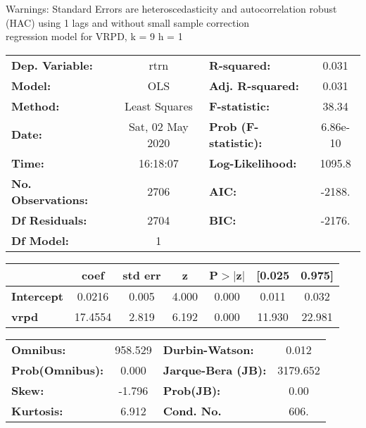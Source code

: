 Warnings: \newline
 [1] Standard Errors are heteroscedasticity and autocorrelation robust (HAC) using 1 lags and without small sample correction\\ 

regression model for VRPD, k = 9 h = 1\begin{center}
\begin{tabular}{lclc}
\toprule
\textbf{Dep. Variable:}    &       rtrn       & \textbf{  R-squared:         } &     0.031   \\
\textbf{Model:}            &       OLS        & \textbf{  Adj. R-squared:    } &     0.031   \\
\textbf{Method:}           &  Least Squares   & \textbf{  F-statistic:       } &     38.34   \\
\textbf{Date:}             & Sat, 02 May 2020 & \textbf{  Prob (F-statistic):} &  6.86e-10   \\
\textbf{Time:}             &     16:18:07     & \textbf{  Log-Likelihood:    } &    1095.8   \\
\textbf{No. Observations:} &        2706      & \textbf{  AIC:               } &    -2188.   \\
\textbf{Df Residuals:}     &        2704      & \textbf{  BIC:               } &    -2176.   \\
\textbf{Df Model:}         &           1      & \textbf{                     } &             \\
\bottomrule
\end{tabular}
\begin{tabular}{lcccccc}
                   & \textbf{coef} & \textbf{std err} & \textbf{z} & \textbf{P$> |$z$|$} & \textbf{[0.025} & \textbf{0.975]}  \\
\midrule
\textbf{Intercept} &       0.0216  &        0.005     &     4.000  &         0.000        &        0.011    &        0.032     \\
\textbf{vrpd}      &      17.4554  &        2.819     &     6.192  &         0.000        &       11.930    &       22.981     \\
\bottomrule
\end{tabular}
\begin{tabular}{lclc}
\textbf{Omnibus:}       & 958.529 & \textbf{  Durbin-Watson:     } &    0.012  \\
\textbf{Prob(Omnibus):} &   0.000 & \textbf{  Jarque-Bera (JB):  } & 3179.652  \\
\textbf{Skew:}          &  -1.796 & \textbf{  Prob(JB):          } &     0.00  \\
\textbf{Kurtosis:}      &   6.912 & \textbf{  Cond. No.          } &     606.  \\
\bottomrule
\end{tabular}
\end{center}

